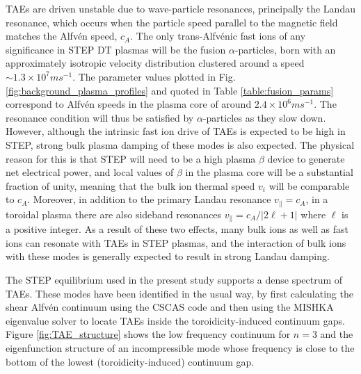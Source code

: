 \documentclass[10pt, a4paper, twoside]{article}
\begin{document}
TAEs are driven unstable due to wave-particle resonances, principally the Landau resonance, which occurs when the particle speed parallel to the magnetic field matches the Alfv\'en speed, $c_A$. The only trans-Alfv\'enic fast ions of any significance in STEP DT plasmas will be the fusion $\alpha$-particles, born with an approximately isotropic velocity distribution clustered around a speed $\sim 1.3\times\si{10^7ms^{-1}}$. The parameter values plotted in Fig. \ref{fig:background_plasma_profiles} and quoted in Table \ref{table:fusion_params} correspond to Alfv\'en speeds in the plasma core of around $2.4\times\si{10^6ms^{-1}}$. The resonance condition will thus be satisfied by $\alpha$-particles as they slow down. However, although the intrinsic fast ion drive of TAEs is expected to be high in STEP, strong bulk plasma damping of these modes is also expected. The physical reason for this is that STEP will need to be a high plasma $\beta$ device to generate net electrical power, and local values of $\beta$ in the plasma core will be a substantial fraction of unity, meaning that the bulk ion thermal speed $v_i$ will be comparable to $c_A$. Moreover, in addition to the primary Landau resonance $v_{\parallel}=c_A$, in a toroidal plasma there are also sideband resonances $v_{\parallel} = c_A/\vert 2\ell+1 \vert$ where $\ell$ is a positive integer. As a result of these two effects, many bulk ions as well as fast ions can resonate with TAEs in STEP plasmas, and the interaction of bulk ions with these modes is generally expected to result in strong Landau damping.

The STEP equilibrium used in the present study supports a dense spectrum of TAEs. These modes have been identified in the usual way, by first calculating the shear Alfv\'en continuum using the CSCAS code \cite{poedts1993} and then using the MISHKA eigenvalue solver \cite{mikhailovskii1997} to locate TAEs inside the toroidicity-induced continuum gaps. Figure \ref{fig:TAE_structure} shows the low frequency continuum for $n=3$ and the eigenfunction structure of an incompressible mode whose frequency is close to the bottom of the lowest (toroidicity-induced) continuum gap.   
 
\end{document}

